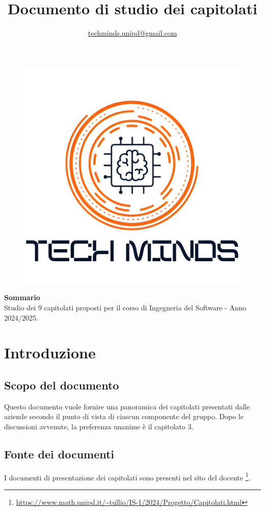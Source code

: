 \documentclass[10pt]{article}
\title{\textbf{Documento di studio dei capitolati}}
\author{\href{mailto:techminds.unipd@gmail.com}{techminds.unipd@gmail.com}}
\date{}
\begin{document}
\begin{figure}
    \centering
    \includegraphics[width=0.8\linewidth]{../../../assets/logo_upscaled.png}
\end{figure}
\maketitle
\begin{center}

  \textbf{Sommario}\\
  \vspace{3mm}
  Studio dei 9 capitolati proposti per il corso di Ingegneria del Software - Anno 2024/2025.
\end{center}

\newpage
\setcounter{tocdepth}{2}
\tableofcontents{\newpage}

\section{Introduzione}
\subsection{Scopo del documento}
Questo documento vuole fornire una panoramica dei capitolati presentati dalle aziende secondo il punto di vista di ciascun componente del gruppo. Dopo le discussioni avvenute, la preferenza unanime è il capitolato 3.
\subsection{Fonte dei documenti}
I documenti di presentazione dei capitolati sono presenti nel sito del docente \footnote{\url{https://www.math.unipd.it/~tullio/IS-1/2024/Progetto/Capitolati.html}}.
\end{document}
